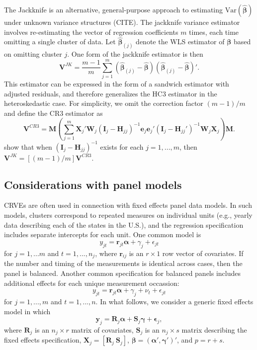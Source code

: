 \documentclass[12pt]{article}\usepackage[]{graphicx}\usepackage[]{color}
\newcommand{\Var}{\text{Var}}
\newcommand{\bm}{\mathbf}
\newcommand{\bs}{\boldsymbol}
\begin{document}
The Jackknife is an alternative, general-purpose approach to estimating $\Var\left(\bs{\hat\beta}\right)$ under unknown variance structures (CITE). 
The jackknife variance estimator involves re-estimating the vector of regression coefficients $m$ times, each time omitting a single cluster of data. 
Let $\bs{\hat\beta}_{(j)}$ denote the WLS estimator of $\bs\beta$ based on omitting cluster $j$. 
One form of the jackknife estimator is then 
\begin{equation}
\label{eq:V_JK}
\bm{V}^{JK} = \frac{m - 1}{m} \sum_{j=1}^m \left(\bs{\hat\beta}_{(j)} - \bs{\hat\beta}\right) \left(\bs{\hat\beta}_{(j)} - \bs{\hat\beta}\right)'.
\end{equation}
This estimator can be expressed in the form of a sandwich estimator with adjusted residuals, and therefore generalizes the HC3 estimator in the heteroskedastic case. 
For simplicity, we omit the correction factor $(m - 1) / m$ and define the CR3 estimator as \[
\bm{V}^{CR3} = \bm{M}\left(\sum_{j=1}^m \bm{X}_j'\bm{W}_j \left(\bm{I}_j - \bm{H}_{jj}\right)^{-1}\bm{e}_j \bm{e}_j' \left(\bm{I}_j - \bm{H}_{jj}'\right)^{-1} \bm{W}_j \bm{X}_j\right) \bm{M}. \]
\citet{Bell2002bias} show that when $\left(\bm{I}_j - \bm{H}_{jj}\right)^{-1}$ exists for each $j = 1,...,m$, then $\bm{V}^{JK} = [(m - 1) / m] \bm{V}^{CR3}$.  

\subsection{Considerations with panel models}

CRVEs are often used in connection with fixed effects panel data models. 
In such models, clusters correspond to repeated measures on individual units (e.g., yearly data describing each of the states in the U.S.), and the regression specification includes separate intercepts for each unit.
One common model is 
\[
y_{jt} = \bm{r}_{jt} \bs\alpha + \gamma_j + \epsilon_{jt} \]
for $j=1,...m$ and $t = 1,...,n_j$, where $\bm{r}_{ij}$ is an $r \times 1$ row vector of covariates. If the number and timing of the measurements is identical across cases, then the panel is balanced. Another common specification for balanced panels includes additional effects for each unique measurement occassion:
\[
y_{jt} = \bm{r}_{jt} \bs\alpha + \gamma_j + \nu_t + \epsilon_{jt} \]
for $j=1,...,m$ and $t = 1,...,n$. 
In what follows, we consider a generic fixed effects model in which
\begin{equation}
\label{eq:fixed_effects}
\bm{y}_j = \bm{R}_j \bs\alpha + \bm{S}_j \bs\gamma + \bs\epsilon_j,
\end{equation}
where $\bm{R}_j$ is an $n_j \times r$ matrix of covariates, $\bm{S}_j$ is an $n_j \times s$ matrix describing the fixed effects specification, $\bm{X}_j = \left[\bm{R}_j \ \bm{S}_j\right]$, $\bs\beta = \left(\bs\alpha', \bs\gamma'\right)'$, and $p = r + s$. 
\end{document}
